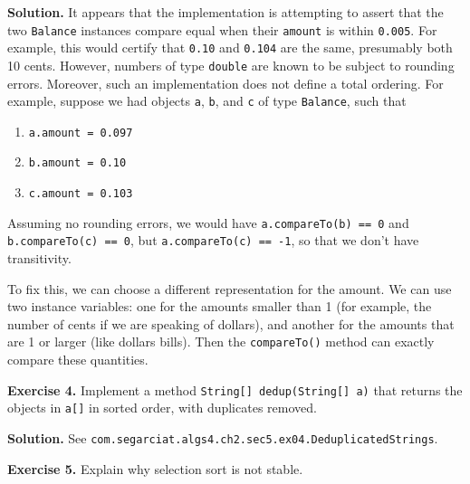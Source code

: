 \documentclass[12pt, a4paper]{article}
\newenvironment{ex}[2][Exercise]
{\par\medskip\noindent \textbf{#1 #2.}}
{\medskip}
\newenvironment{sol}[1][Solution]
{\par\medskip\noindent \textbf{#1.} }
{\medskip}
\begin{document}
	\begin{sol}
		It appears that the implementation is attempting to assert that the two \texttt{Balance}
		instances compare equal when their \texttt{amount} is within \texttt{0.005}.
		For example, this would certify that \texttt{0.10} and \texttt{0.104} are the
		same, presumably both 10 cents. However, numbers of type \texttt{double} are
		known to be subject to rounding errors. Moreover, such an implementation
		does not define a total ordering. For example, suppose we had objects \texttt{a},
		\texttt{b}, and \texttt{c} of type \texttt{Balance}, such that
		\begin{enumerate}[label=(\roman*)]
			\item \texttt{a.amount = 0.097}
			\item \texttt{b.amount = 0.10}
			\item \texttt{c.amount = 0.103}
		\end{enumerate}
		Assuming no rounding errors, we would have \texttt{a.compareTo(b) == 0}
		and \texttt{b.compareTo(c) == 0}, but \texttt{a.compareTo(c) == -1},
		so that we don't have transitivity.
		
		To fix this, we can choose a different representation for the amount.
		We can use two instance variables: one for the amounts smaller than 1
		(for example, the number of cents if we are speaking of dollars), and
		another for the amounts that are 1 or larger (like dollars bills).
		Then the \texttt{compareTo()} method can exactly compare these quantities.
	\end{sol}
	\begin{ex}{4}
		Implement a method \texttt{String[] dedup(String[] a)} that returns the objects
		in \texttt{a[]} in sorted order, with duplicates removed.
	\end{ex}
	\begin{sol}
		See \texttt{com.segarciat.algs4.ch2.sec5.ex04.DeduplicatedStrings}.
	\end{sol}
	\begin{ex}{5}
		Explain why selection sort is not stable.
	\end{ex}
\end{document}
